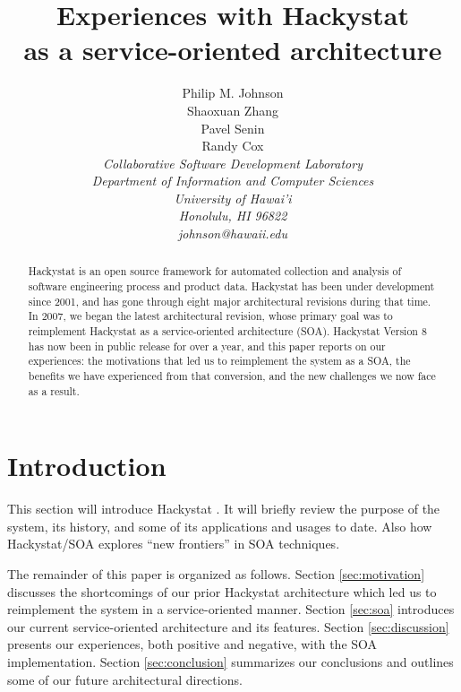 \documentclass[conference,12pt]{IEEEtran}
\begin{document}
\title{Experiences with Hackystat \\ as a service-oriented architecture}

\author{Philip M. Johnson \\
        Shaoxuan Zhang \\
        Pavel Senin \\
        Randy Cox \\
\em  Collaborative Software Development Laboratory \\
      Department of Information and Computer Sciences \\
      University of Hawai'i \\
      Honolulu, HI 96822 \\
      johnson@hawaii.edu \\
}


\maketitle

\begin{abstract}  %
Hackystat is an open source framework for automated collection and analysis
of software engineering process and product data.  Hackystat has been under
development since 2001, and has gone through eight major architectural
revisions during that time.  In 2007, we began the latest architectural
revision, whose primary goal was to reimplement Hackystat as a
service-oriented architecture (SOA).  Hackystat Version 8 has now been in
public release for over a year, and this paper reports on our experiences:
the motivations that led us to reimplement the system as a SOA, the
benefits we have experienced from that conversion, and the new challenges
we now face as a result.
\end{abstract}

\section{Introduction}
\label{sec:intro}

This section will introduce Hackystat \cite{csdl2-06-06}. It will briefly
review the purpose of the system, its history, and some of its applications
and usages to date.  Also how Hackystat/SOA explores ``new frontiers'' in SOA techniques. 



The remainder of this paper is organized as follows.  Section \ref{sec:motivation} 
discusses the shortcomings of our prior Hackystat architecture which led us to reimplement
the system in a service-oriented manner.  Section \ref{sec:soa} introduces our current
service-oriented architecture and its features.  Section \ref{sec:discussion} presents 
our experiences, both positive and negative, with the SOA implementation.  Section \ref{sec:conclusion}
summarizes our conclusions and outlines some of our future architectural directions. 
\end{document}
